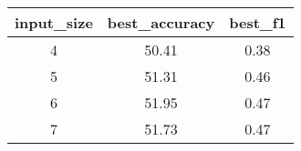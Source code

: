 \begin{tabular}{ccc}
	input\_size & best\_accuracy & best\_f1 \\\hline\hline
	4           & 50.41          & 0.38     \\
	5           & 51.31          & 0.46     \\
	6           & 51.95          & 0.47     \\
	7           & 51.73          & 0.47     \\
\end{tabular}